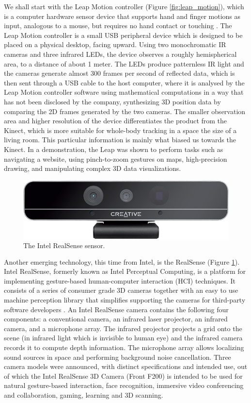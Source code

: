 \documentclass[a4paper, 12pt]{amsart}
\begin{document}
We shall start with the Leap Motion controller (Figure \ref{fig:leap_motion}), which is a computer hardware sensor device that supports hand and finger motions as input, analogous to a mouse, but requires no hand contact or touching \cite{bib_leap_motion}. The Leap Motion controller is a small USB peripheral device which is designed to be placed on a physical desktop, facing upward. Using two monochromatic IR cameras and three infrared LEDs, the device observes a roughly hemispherical area, to a distance of about 1 meter. The LEDs produce patternless IR light and the cameras generate almost 300 frames per second of reflected data, which is then sent through a USB cable to the host computer, where it is analysed by the Leap Motion controller software using mathematical computations in a way that has not been disclosed by the company, synthesizing 3D position data by comparing the 2D frames generated by the two cameras. The smaller observation area and higher resolution of the device differentiates the product from the Kinect, which is more suitable for whole-body tracking in a space the size of a living room. This particular information is mainly what biased us towards the Kinect. In a demonstration, the Leap was shown to perform tasks such as navigating a website, using pinch-to-zoom gestures on maps, high-precision drawing, and manipulating complex 3D data visualizations.

\begin{figure}[htb]
\centering
\includegraphics[width=.9\linewidth]{fig_intel_realsense}
\caption{The Intel RealSense sensor.}
\label{fig:intel_realsense}
\end{figure}

Another emerging technology, this time from Intel, is the RealSense (Figure \ref{fig:intel_realsense}). Intel RealSense, formerly known as Intel Perceptual Computing, is a platform for implementing gesture-based human-computer interaction (HCI) techniques. It consists of a series of consumer grade 3D cameras together with an easy to use machine perception library that simplifies supporting the cameras for third-party software developers \cite{bib_intel_real_sense}. An Intel RealSense camera contains the following four components: a conventional camera, an infrared laser projector, an infrared camera, and a microphone array. The infrared projector projects a grid onto the scene (in infrared light which is invisible to human eye) and the infrared camera records it to compute depth information. The microphone array allows localizing sound sources in space and performing background noise cancellation. Three camera models were announced, with distinct specifications and intended use, out of which the Intel RealSense 3D Camera (Front F200) is intended to be used for natural gesture-based interaction, face recognition, immersive video conferencing and collaboration, gaming, learning and 3D scanning.
\end{document}
